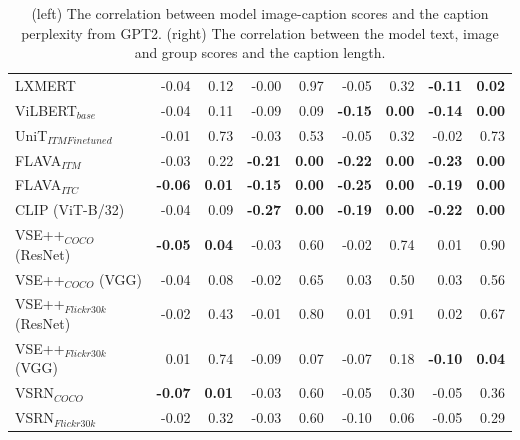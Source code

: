 \begin{table}[ht]
\begin{adjustbox}{max width=\textwidth}
\begin{tabular}{l|rr|rrrrrr}
 LXMERT                       & -0.04          & 0.12          & -0.00          & 0.97          & -0.05          & 0.32          & \textbf{-0.11} & \textbf{0.02} \\
 ViLBERT$_{base}$             & -0.04          & 0.11          & -0.09          & 0.09          & \textbf{-0.15} & \textbf{0.00} & \textbf{-0.14} & \textbf{0.00} \\
 UniT$_{ITM Finetuned}$       & -0.01          & 0.73          & -0.03          & 0.53          & -0.05          & 0.32          & -0.02          & 0.73          \\
 FLAVA$_{ITM}$                & -0.03          & 0.22          & \textbf{-0.21} & \textbf{0.00} & \textbf{-0.22} & \textbf{0.00} & \textbf{-0.23} & \textbf{0.00} \\
 FLAVA$_{ITC}$        & \textbf{-0.06} & \textbf{0.01} & \textbf{-0.15} & \textbf{0.00} & \textbf{-0.25} & \textbf{0.00} & \textbf{-0.19} & \textbf{0.00} \\
 CLIP (ViT-B/32)              & -0.04          & 0.09          & \textbf{-0.27} & \textbf{0.00} & \textbf{-0.19} & \textbf{0.00} & \textbf{-0.22} & \textbf{0.00} \\
 VSE++$_{COCO}$ (ResNet)      & \textbf{-0.05} & \textbf{0.04} & -0.03          & 0.60          & -0.02          & 0.74          & 0.01           & 0.90          \\
 VSE++$_{COCO}$ (VGG)         & -0.04          & 0.08          & -0.02          & 0.65          & 0.03           & 0.50          & 0.03           & 0.56          \\
 VSE++$_{Flickr30k}$ (ResNet) & -0.02          & 0.43          & -0.01          & 0.80          & 0.01           & 0.91          & 0.02           & 0.67          \\
 VSE++$_{Flickr30k}$ (VGG)    & 0.01           & 0.74          & -0.09          & 0.07          & -0.07          & 0.18          & \textbf{-0.10} & \textbf{0.04} \\
 VSRN$_{COCO}$                & \textbf{-0.07} & \textbf{0.01} & -0.03          & 0.60          & -0.05          & 0.30          & -0.05          & 0.36          \\
 VSRN$_{Flickr30k}$           & -0.02          & 0.32          & -0.03          & 0.60          & -0.10          & 0.06          & -0.05          & 0.29          \\
\bottomrule
\end{tabular}
\end{adjustbox}
\caption{(left) The correlation between model image-caption scores and the caption perplexity from GPT2. (right) The correlation between the model text, image and group scores and the caption length.}
\label{tab:perplexity-and-length-correlations-baseline}
\end{table}

